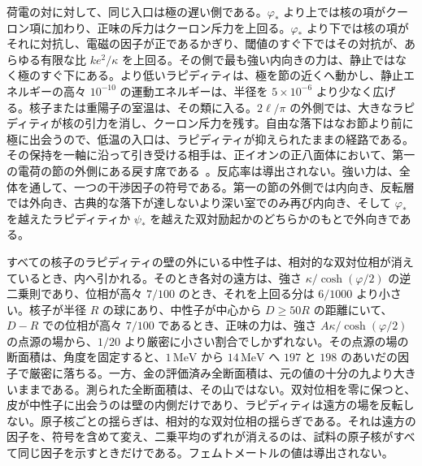 \documentclass[a4paper]{article}
\begin{document}
荷電の対に対して、同じ入口は極の遅い側である。\(\varphi_*\) より上では核の項がクーロン項に加わり、正味の斥力はクーロン斥力を上回る。\(\varphi_*\) より下では核の項がそれに対抗し、電磁の因子が正であるかぎり、閾値のすぐ下ではその対抗が、あらゆる有限な比 \(k e^{2}/\kappa\) を上回る。その側で最も強い内向きの力は、静止ではなく極のすぐ下にある。より低いラピディティは、極を節の近くへ動かし、静止エネルギーの高々 \(10^{-10}\) の運動エネルギーは、半径を \(5\times 10^{-6}\) より少なく広げる。核子または重陽子の室温は、その類に入る。\(2\ell/\pi\) の外側では、大きなラピディティが核の引力を消し、クーロン斥力を残す。自由な落下はなお節より前に極に出会うので、低温の入口は、ラピディティが抑えられたままの経路である。その保持を一軸に沿って引き受ける相手は、正イオンの正八面体において、第一の電荷の節の外側にある戻す席である~\cite{dst-cold}。反応率は導出されない。強い力は、全体を通して、一つの干渉因子の符号である。第一の節の外側では内向き、反転層では外向き、古典的な落下が達しないより深い室でのみ再び内向き、そして \(\varphi_*\) を越えたラピディティか \(\psi_*\) を越えた双対励起かのどちらかのもとで外向きである。

すべての核子のラピディティの壁の外にいる中性子は、相対的な双対位相が消えているとき、内へ引かれる。そのとき各対の遠方は、強さ \(\kappa/\cosh(\varphi/2)\) の逆二乗則であり、位相が高々 \(7/100\) のとき、それを上回る分は \(6/1000\) より小さい。核子が半径 \(R\) の球にあり、中性子が中心から \(D\ge 50R\) の距離にいて、\(D-R\) での位相が高々 \(7/100\) であるとき、正味の力は、強さ \(A\kappa/\cosh(\varphi/2)\) の点源の場から、\(1/20\) より厳密に小さい割合でしかずれない。その点源の場の断面積は、角度を固定すると、\(1\,\mathrm{MeV}\) から \(14\,\mathrm{MeV}\) へ \(197\) と \(198\) のあいだの因子で厳密に落ちる。一方、金の評価済み全断面積は、元の値の十分の九より大きいままである。測られた全断面積は、その山ではない。双対位相を零に保つと、皮が中性子に出会うのは壁の内側だけであり、ラピディティは遠方の場を反転しない。原子核ごとの揺らぎは、相対的な双対位相の揺らぎである。それは遠方の因子を、符号を含めて変え、二乗平均のずれが消えるのは、試料の原子核がすべて同じ因子を示すときだけである。フェムトメートルの値は導出されない。
\end{document}
